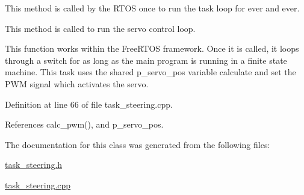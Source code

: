 This method is called by the R\+T\+OS once to run the task loop for ever and ever. 

This method is called to run the servo control loop.

This function works within the Free\+R\+T\+OS framework. Once it is called, it loops through a switch for as long as the main program is running in a finite state machine. This task uses the shared p\+\_\+servo\+\_\+pos variable calculate and set the P\+WM signal which activates the servo. 

Definition at line 66 of file task\+\_\+steering.\+cpp.



References calc\+\_\+pwm(), and p\+\_\+servo\+\_\+pos.



The documentation for this class was generated from the following files\+:\begin{DoxyCompactItemize}
\item 
\mbox{\hyperlink{task__steering_8h}{task\+\_\+steering.\+h}}\item 
\mbox{\hyperlink{task__steering_8cpp}{task\+\_\+steering.\+cpp}}\end{DoxyCompactItemize}

